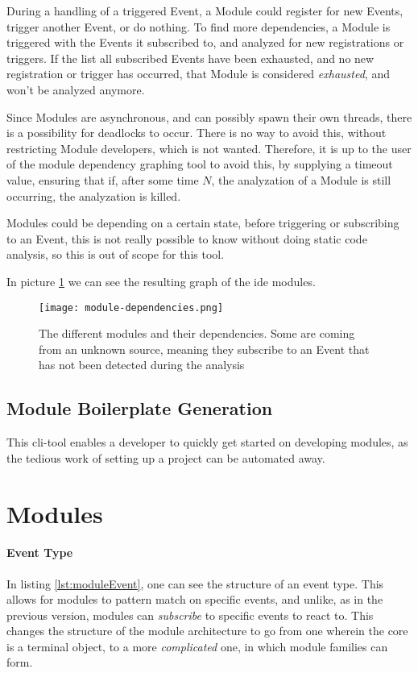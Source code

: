 During a handling of a triggered Event, a Module could register for new
Events, trigger another Event, or do nothing. To find more dependencies, a
Module is triggered with the Events it subscribed to, and analyzed for new
registrations or triggers. If the list all subscribed Events have been
exhausted, and no new registration or trigger has occurred, that Module is
considered \textit{exhausted}, and won't be analyzed anymore.

Since Modules are asynchronous, and can possibly spawn their own threads, there
is a possibility for deadlocks to occur. There is no way to avoid this, without
restricting Module developers, which is not wanted. Therefore, it is up to
the user of the module dependency graphing tool to avoid this, by supplying a
timeout value, ensuring that if, after some time $N$, the analyzation of a
Module is still occurring, the analyzation is killed.

Modules could be depending on a certain state, before triggering or
subscribing to an Event, this is not really possible to know without doing
static code analysis, so this is out of scope for this tool.

In picture \ref{pic:modDep} we can see the resulting graph of the \gls{ide}
modules.

\begin{figure}[H]
  \centering
  \texttt{[image: module-dependencies.png]}
  \caption{
    The different modules and their dependencies. Some are coming from an
    unknown source, meaning they subscribe to an Event that has not been
    detected during the analysis
  }
  \label{pic:modDep}
\end{figure}

\subsection{Module Boilerplate Generation}


This \gls{cli}-tool enables a developer to quickly get started on developing
modules, as the tedious work of setting up a project can be automated away.

\section{Modules}

\paragraph{Event Type} In listing \ref{lst:moduleEvent}, one can see the
structure of an event type. This allows for modules to pattern match on specific
events, and unlike, as in the previous version, modules can \textit{subscribe}
to specific events to react to. This changes the structure of the module
architecture to go from one wherein the core is a terminal object, to a more
\textit{complicated} one, in which module families can form.

